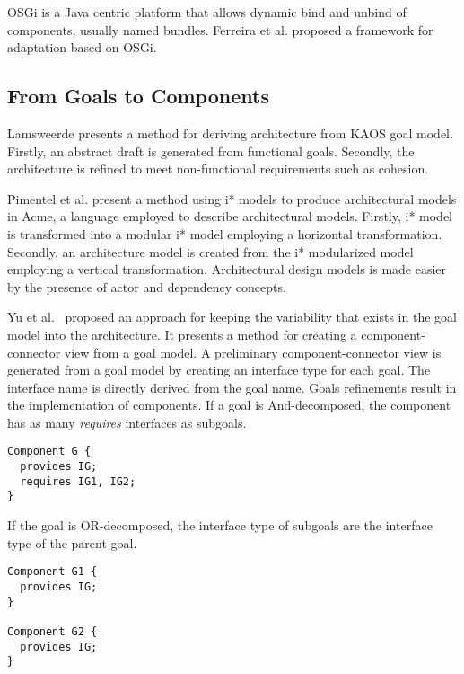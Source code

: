 OSGi\cite{the_osgi_alliance_osgi_2007} is a Java centric platform that allows dynamic bind and unbind of components, usually named bundles. Ferreira et al.\cite{ferreira_-osgi:_2012} proposed a framework for adaptation based on OSGi.

\subsection{From Goals to Components}

Lamsweerde \cite{van_lamsweerde_system_2003} presents a method for deriving architecture from KAOS goal model\cite{dardenne_goal-directed_1993}. Firstly, an abstract draft is generated from functional goals. Secondly, the architecture is refined to meet non-functional requirements such as cohesion.

Pimentel et al. \cite{pimentel_deriving_2012} present a method  using i* models to produce architectural models in Acme, a language employed to describe architectural models.  Firstly, i* model is transformed into a modular i* model employing a horizontal transformation. Secondly, an architecture model is created from the i* modularized model employing a vertical transformation. Architectural design models is made easier by the
presence of actor and dependency concepts.

Yu et al.~\cite{yu_goals_2008} proposed an approach for keeping the variability that exists in the goal model into the architecture.
It presents a method for creating a component-connector view from a goal model.
A preliminary component-connector view is generated from a goal model by creating an interface type for each goal. The interface name is directly derived from the goal name. Goals refinements result in the implementation of components.
If a goal is And-decomposed, the component has as many \emph{requires} interfaces as subgoals.

\begin{lstlisting}
Component G {
  provides IG;
  requires IG1, IG2;
}
\end{lstlisting}

If the goal is OR-decomposed, the interface type of subgoals are the interface type of the parent goal.

\begin{lstlisting}
Component G1 {
  provides IG;
}

Component G2 {
  provides IG;
}
\end{lstlisting}




